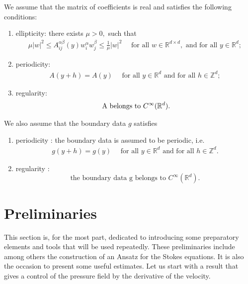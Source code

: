 \documentclass[11pt, reqno]{amsart}
\theoremstyle{definition}
\theoremstyle{remark}
\numberwithin{equation}{section}
\begin{document}
	
	\noindent We assume that the  matrix of coefficients is real and satisfies the following conditions:
	\begin{enumerate}
		\item ellipticity: there exists $\mu>0,$ such that 
		\begin{align}
			\mu |w|^2 \leq  A^{\alpha\beta}_{ij} (y)w^{\alpha}_{i} w^{\beta}_{j} \leq  \frac{1}{\mu }|w|^2 \quad \mbox{  for all } w\in \mathbb{R}^{d\times d},  \mbox{  and for all } y\in \mathbb{R}^d;\label{ellipticity}
		\end{align}
		\item  periodicity:
		\begin{align}
			A (y+h)=A(y)\quad \mbox{  for all } y\in \mathbb{R}^{d} \mbox{  and for all } h\in \mathbb{Z}^d;\label{periodicity}
		\end{align}
		\item regularity:
		\begin{equation}
			\mbox{ A belongs to }C^\infty (\mathbb{R}^{d} ). \label{regular_A}\\
		\end{equation}
	\end{enumerate}
	We also assume that the boundary data $g$ satisfies
	\begin{enumerate}
		\item  periodicity : the boundary data is assumed to be periodic, i.e.
		\begin{align}
			g (y+h)=g(y)\quad \mbox{  for all } y\in \mathbb{R}^{d} \mbox{  and for all } h\in \mathbb{Z}^d.
		\end{align}
		\item regularity : 
		\begin{equation}
			\mbox{the boundary data g  belongs to }C^\infty (\mathbb{R}^{d} ). \label{regular_g}
		\end{equation}
		
	\end{enumerate}
	
	\section{Preliminaries}\label{section_prepa}


\noindent	This section is, for the most part, dedicated to introducing some  preparatory  elements and tools that will be used repeatedly. These preliminaries include among others the construction of an Ansatz for the Stokes equations. It is also the occasion to present some useful estimates. Let us start with  a result that gives a control of the pressure field by the derivative of the velocity.
\end{document}
